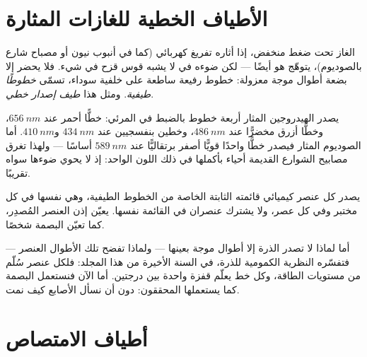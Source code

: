 \section{الأطياف الخطية للغازات المثارة}

\begin{definition}\label{def:g10:light-spectra:emission}
الغاز تحت ضغط منخفض، إذا أثاره تفريغ كهربائي (كما في أنبوب نيون
أو مصباح شارع بالصوديوم)، يتوهّج هو أيضًا --- لكن ضوءه في 
لا يشبه قوس قزح في شيء. فلا يحضر إلا بضعة أطوال موجة
معزولة: خطوط رفيعة ساطعة على خلفية سوداء، تسمّى \emph{خطوطًا
طيفية}. ومثل هذا  \emph{طيف إصدار
خطي}.
\end{definition}

\begin{example}\label{ex:g10:light-spectra:hydrogen}
يصدر الهيدروجين المثار أربعة خطوط بالضبط في المرئي: خطًّا أحمر عند
$\qty{656}{nm}$، وخطًّا أزرق مخضرًّا عند $\qty{486}{nm}$، وخطين
بنفسجيين عند $\qty{434}{nm}$ و$\qty{410}{nm}$. أما الصوديوم المثار فيصدر
خطًّا واحدًا قويًّا أصفر برتقاليًّا عند $\qty{589}{nm}$ أساسًا --- ولهذا
تغرق مصابيح الشوارع القديمة أحياء بأكملها في ذلك اللون الواحد:
إذ لا يحوي ضوءها سواه تقريبًا.
\end{example}

\begin{proposition}\label{prop:g10:light-spectra:fingerprint}
يصدر كل عنصر كيميائي قائمته الثابتة الخاصة من الخطوط الطيفية،
وهي نفسها في كل مختبر وفي كل عصر، ولا يشترك عنصران في
القائمة نفسها.  يعيّن إذن العنصر
المُصدِر، كما تعيّن البصمة شخصًا.
\end{proposition}
\admitted

\begin{remark}\label{rem:g10:light-spectra:whylines}
أما لماذا لا تصدر الذرة إلا أطوال موجة بعينها --- ولماذا تفضح تلك
الأطوال العنصر --- فتفسّره النظرية الكمومية للذرة، في
السنة الأخيرة من هذا المجلد: فلكل عنصر سُلّم من مستويات
الطاقة، وكل خط يعلّم قفزة واحدة بين درجتين. أما الآن فنستعمل
البصمة كما يستعملها المحققون: دون أن نسأل الأصابع كيف نمت.
\end{remark}

\section{أطياف الامتصاص}

